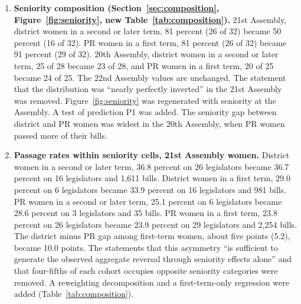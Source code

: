 \documentclass[11pt]{article}
\begin{document}
{\begin{enumerate}
\item \textbf{Seniority composition (Section~\ref{sec:composition}, Figure~\ref{fig:seniority}, new Table~\ref{tab:composition}).} 21st Assembly, district women in a second or later term, 81 percent (26 of 32) became 50 percent (16 of 32). PR women in a first term, 81 percent (26 of 32) became 91 percent (29 of 32). 20th Assembly, district women in a second or later term, 25 of 28 became 23 of 28, and PR women in a first term, 20 of 25 became 24 of 25. The 22nd Assembly values are unchanged. The statement that the distribution was ``nearly perfectly inverted'' in the 21st Assembly was removed. Figure~\ref{fig:seniority} was regenerated with seniority at the Assembly. A test of prediction P1 was added. The seniority gap between district and PR women was widest in the 20th Assembly, when PR women passed more of their bills.
\item \textbf{Passage rates within seniority cells, 21st Assembly women.} District women in a second or later term, 36.8 percent on 26 legislators became 36.7 percent on 16 legislators and 1,611 bills. District women in a first term, 29.0 percent on 6 legislators became 33.9 percent on 16 legislators and 981 bills. PR women in a second or later term, 25.1 percent on 6 legislators became 28.6 percent on 3 legislators and 35 bills. PR women in a first term, 23.8 percent on 26 legislators became 23.9 percent on 29 legislators and 2,254 bills. The district minus PR gap among first-term women, about five points (5.2), became 10.0 points. The statements that this asymmetry ``is sufficient to generate the observed aggregate reversal through seniority effects alone'' and that four-fifths of each cohort occupies opposite seniority categories were removed. A reweighting decomposition and a first-term-only regression were added (Table~\ref{tab:composition}).

\end{enumerate}}
\end{document}
